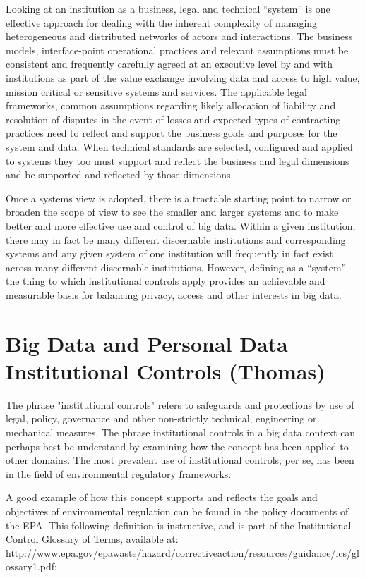 Looking at an institution as a business, legal and technical “system” is one effective approach for dealing with the inherent complexity of managing heterogeneous and distributed networks of actors and interactions.
The business models, interface-point operational practices and relevant assumptions must be consistent and frequently carefully agreed at an executive level by and with institutions as part of the value exchange involving data and access to high value, mission critical or sensitive systems and services.
The applicable legal frameworks, common assumptions regarding likely allocation of liability and resolution of disputes in the event of losses and expected types of contracting practices need to reflect and support the business goals and purposes for the system and data.
When technical standards are selected, configured and applied to systems they too must support and reflect the business and legal dimensions and be supported and reflected by those dimensions.

Once a systems view is adopted, there is a tractable starting point to narrow or broaden the scope of view to see the smaller and larger systems and to make better and more effective use and control of big data.
Within a given institution, there may in fact be many different discernable institutions and corresponding systems and any given system of one institution will frequently in fact exist across many different discernable institutions. 
However, defining as a “system” the thing to which institutional controls apply provides an achievable and measurable basis for balancing privacy, access and other interests in big data.

\section{Big Data and Personal Data Institutional Controls (Thomas)}

The phrase "institutional controls" refers to safeguards and protections by use of legal, policy, governance and other non-strictly technical, engineering or mechanical measures.
The phrase institutional controls in a big data context can perhaps best be understand by examining how the concept has been applied to other domains.
The most prevalent use of institutional controls, per se, has been in the field of environmental regulatory frameworks.

A good example of how this concept supports and reflects the goals and objectives of environmental regulation can be found in the policy documents of the EPA.
This following definition is instructive, and is part of the Institutional Control Glossary of Terms, available at: http://www.epa.gov/epawaste/hazard/correctiveaction/resources/guidance/ics/glossary1.pdf:

